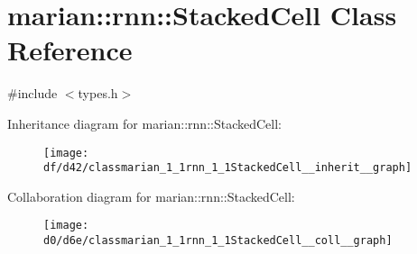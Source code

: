 \hypertarget{classmarian_1_1rnn_1_1StackedCell}{}\section{marian\+:\+:rnn\+:\+:Stacked\+Cell Class Reference}
\label{classmarian_1_1rnn_1_1StackedCell}


{\ttfamily \#include $<$types.\+h$>$}



Inheritance diagram for marian\+:\+:rnn\+:\+:Stacked\+Cell\+:
\nopagebreak
\begin{figure}[H]
\begin{center}
\leavevmode
\texttt{[image: df/d42/classmarian\_1\_1rnn\_1\_1StackedCell\_\_inherit\_\_graph]}
\end{center}
\end{figure}


Collaboration diagram for marian\+:\+:rnn\+:\+:Stacked\+Cell\+:
\nopagebreak
\begin{figure}[H]
\begin{center}
\leavevmode
\texttt{[image: d0/d6e/classmarian\_1\_1rnn\_1\_1StackedCell\_\_coll\_\_graph]}
\end{center}
\end{figure}
